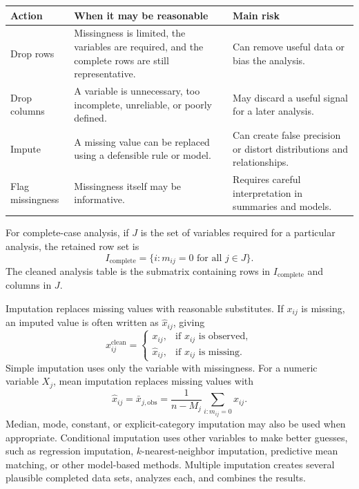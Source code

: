 {\begin{center}
\begin{tabular}{p{}p{}p{}}
\hline
\textbf{Action} & \textbf{When it may be reasonable} & \textbf{Main risk} \\
\hline
Drop rows & Missingness is limited, the variables are required, and the complete rows are still representative. & Can remove useful data or bias the analysis. \\
Drop columns & A variable is unnecessary, too incomplete, unreliable, or poorly defined. & May discard a useful signal for a later analysis. \\
Impute & A missing value can be replaced using a defensible rule or model. & Can create false precision or distort distributions and relationships. \\
Flag missingness & Missingness itself may be informative. & Requires careful interpretation in summaries and models. \\
\hline
\end{tabular}
\end{center}

For complete-case analysis, if $J$ is the set of variables required for a particular analysis, the retained row set is
\begin{equation}
  I_{\text{complete}}=\{i: m_{ij}=0 \text{ for all } j\in J\}.
  \label{eq:ch3-complete-case-set}
\end{equation}
The cleaned analysis table is the submatrix containing rows in $I_{\text{complete}}$ and columns in $J$.

Imputation replaces missing values with reasonable substitutes.  If $x_{ij}$ is missing, an imputed value is often written as $\widehat{x}_{ij}$, giving
\begin{equation}
  x_{ij}^{\text{clean}}=\begin{cases}
    x_{ij}, & \text{if } x_{ij} \text{ is observed},\\
    \widehat{x}_{ij}, & \text{if } x_{ij} \text{ is missing}.
  \end{cases}
  \label{eq:ch3-imputed-value}
\end{equation}
Simple imputation uses only the variable with missingness.  For a numeric variable $X_j$, mean imputation replaces missing values with
\begin{equation}
  \widehat{x}_{ij}=\bar{x}_{j,\text{obs}}
  =\frac{1}{n-M_j}\sum_{i:m_{ij}=0}x_{ij}.
  \label{eq:ch3-mean-imputation}
\end{equation}
Median, mode, constant, or explicit-category imputation may also be used when appropriate.  Conditional imputation uses other variables to make better guesses, such as regression imputation, $k$-nearest-neighbor imputation, predictive mean matching, or other model-based methods.  Multiple imputation creates several plausible completed data sets, analyzes each, and combines the results.

}
